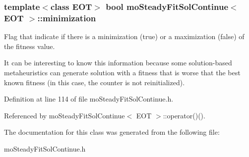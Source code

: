 \subsubsection{\setlength{\rightskip}{0pt plus 5cm}template$<$class EOT$>$ bool {\bf moSteadyFitSolContinue}$<$ EOT $>$::{\bf minimization}\hspace{0.3cm}{\tt  [private]}}\label{classmo_steady_fit_sol_continue_4176d8cc6fda6cb854997a845faaf8a4}


Flag that indicate if there is a minimization (true) or a maximization (false) of the fitness value. 

It can be interesting to know this information because some solution-based metaheuristics can generate solution with a fitness that is worse that the best known fitness (in this case, the counter is not reinitialized). 

Definition at line 114 of file moSteadyFitSolContinue.h.

Referenced by moSteadyFitSolContinue$<$ EOT $>$::operator()().

The documentation for this class was generated from the following file:\begin{CompactItemize}
\item 
moSteadyFitSolContinue.h\end{CompactItemize}
